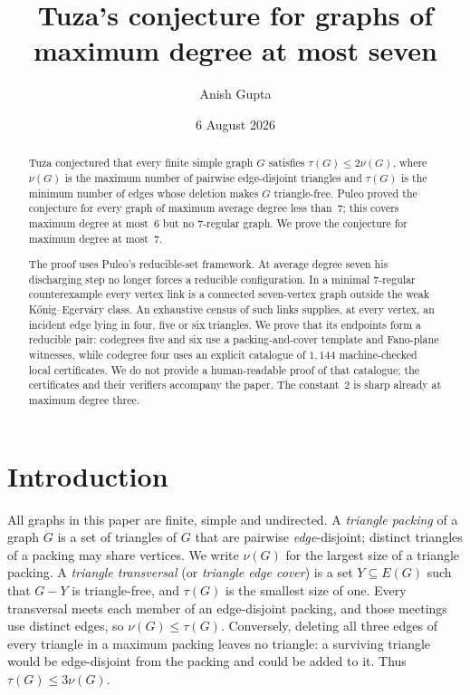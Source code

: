 \documentclass[11pt,a4paper]{amsart}
\title[Tuza's conjecture for maximum degree seven]
  {Tuza's conjecture for graphs of maximum degree at most seven}
\author{Anish Gupta}
\date{6 August 2026}
\theoremstyle{plain}
\theoremstyle{definition}
\begin{document}
\begin{abstract}
Tuza conjectured that every finite simple graph $G$ satisfies
$\tau(G)\le 2\nu(G)$, where $\nu(G)$ is the maximum number of pairwise
edge-disjoint triangles and $\tau(G)$ is the minimum number of edges
whose deletion makes $G$ triangle-free. Puleo proved the conjecture for every
graph of maximum average degree less than~$7$; this covers maximum degree at
most~$6$ but no $7$-regular graph. We prove the conjecture for maximum degree
at most~$7$.

The proof uses Puleo's reducible-set framework. At average degree seven his
discharging step no longer forces a reducible configuration. In a minimal
$7$-regular counterexample every vertex link is a connected seven-vertex graph
outside the weak K\H{o}nig--Egerv\'ary class. An exhaustive census of such
links supplies, at every vertex, an incident edge lying in four, five or six
triangles. We prove that its
endpoints form a reducible pair: codegrees five and six use a
packing-and-cover template and Fano-plane witnesses, while codegree four uses
an explicit catalogue of $1{,}144$ machine-checked local certificates. We
do not provide a human-readable proof of that catalogue; the certificates and
their verifiers accompany the paper. The constant~$2$ is sharp already at
maximum degree three.
\end{abstract}

\maketitle

\section{Introduction}

All graphs in this paper are finite, simple and undirected. A
\emph{triangle packing} of a graph $G$ is a set of triangles of $G$ that are
pairwise \emph{edge}-disjoint; distinct triangles of a packing may share
vertices. We write $\nu(G)$ for the largest size of a triangle packing. A
\emph{triangle transversal} (or \emph{triangle edge cover}) is a set
$Y\subseteq E(G)$ such that $G-Y$ is triangle-free, and $\tau(G)$ is the
smallest size of one. Every transversal meets each member of an
edge-disjoint packing, and those meetings use distinct edges, so
$\nu(G)\le\tau(G)$. Conversely, deleting all three edges of every triangle
in a maximum packing leaves no triangle: a surviving triangle would be
edge-disjoint from the packing and could be added to it. Thus
$\tau(G)\le 3\nu(G)$.
\end{document}
